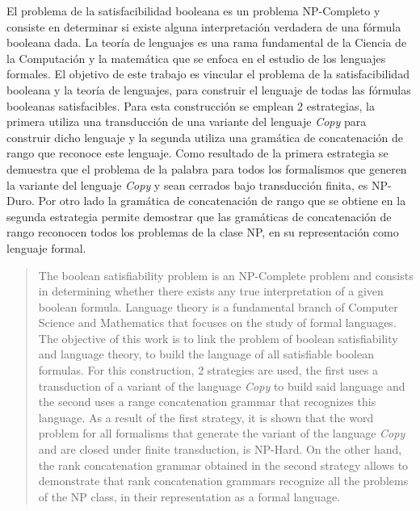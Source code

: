 \begin{resumen}
	El problema de la satisfacibilidad booleana es un problema NP-Completo y consiste en determinar si existe
	alguna interpretación verdadera de una fórmula booleana dada. La teoría de lenguajes es una rama fundamental de la Ciencia de la Computación y la matemática que se enfoca 
	en el estudio de los lenguajes formales. El objetivo de este trabajo es vincular el problema de la satisfacibilidad
	booleana y la teoría de lenguajes, para construir el lenguaje de todas las fórmulas booleanas satisfacibles.
	Para esta construcción se emplean 2 estrategias, la primera utiliza una transducción de una variante del lenguaje
	\textit{Copy} para construir dicho lenguaje y la segunda utiliza una gramática de concatenación de rango 
	que reconoce este lenguaje. Como resultado de la primera estrategia se demuestra que el problema de la palabra 
	para todos los formalismos
	que generen la variante del lenguaje \textit{Copy} y sean cerrados bajo transducción finita, es NP-Duro.
	Por otro lado la gramática de concatenación de rango que se obtiene en la segunda estrategia permite 
	demostrar que las gramáticas de concatenación de rango reconocen todos los problemas de la clase NP, en 
	su representación como lenguaje formal.
\end{resumen}

\begin{abstract}
	The boolean satisfiability problem is an NP-Complete problem and consists in determining whether there exists
	any true interpretation of a given boolean formula. Language theory is a fundamental branch of Computer Science and Mathematics that focuses
	on the study of formal languages. The objective of this work is to link the problem of boolean
	satisfiability and language theory, to build the language of all satisfiable boolean formulas.
	For this construction, 2 strategies are used, the first uses a transduction of a variant of the language
	\textit{Copy} to build said language and the second uses a range concatenation grammar
	that recognizes this language. As a result of the first strategy, it is shown that the word problem
	for all formalisms
	that generate the variant of the language \textit{Copy} and are closed under finite transduction, is NP-Hard.
	On the other hand, the rank concatenation grammar obtained in the second strategy allows
	to demonstrate that rank concatenation grammars recognize all the problems of the NP class, in
	their representation as a formal language.
\end{abstract}